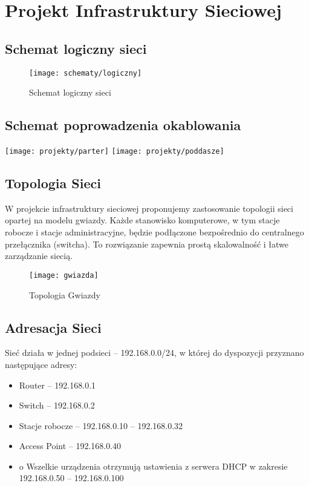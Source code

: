 \section{Projekt Infrastruktury Sieciowej}

\subsection{Schemat logiczny sieci}
        
    \begin{figure}[!htb]
        \centering
        \texttt{[image: schematy/logiczny]}
        \caption{Schemat logiczny sieci}
    \end{figure}

\subsection{Schemat poprowadzenia okablowania}

    \texttt{[image: projekty/parter]}
    \texttt{[image: projekty/poddasze]}
\pagebreak

\subsection{Topologia Sieci}

    W projekcie infrastruktury sieciowej proponujemy zastosowanie topologii sieci opartej na modelu gwiazdy. Każde stanowisko komputerowe, w tym stacje robocze i stacje administracyjne, będzie podłączone bezpośrednio do centralnego przełącznika (switcha). To rozwiązanie zapewnia prostą skalowalność i łatwe zarządzanie siecią.

        
    \begin{figure}[!htb]
        \centering
        \texttt{[image: gwiazda]}
        \caption{Topologia Gwiazdy}
    \end{figure}

\subsection{Adresacja Sieci}

Sieć działa w jednej podsieci – 192.168.0.0/24, w której do dyspozycji przyznano następujące adresy:

\begin{itemize}
    \item Router – 192.168.0.1
    \item Switch – 192.168.0.2
    \item Stacje robocze – 192.168.0.10 – 192.168.0.32
    \item Access Point – 192.168.0.40
    \item o Wszelkie urządzenia otrzymują ustawienia z serwera DHCP w zakresie 192.168.0.50 –
    192.168.0.100
\end{itemize}



